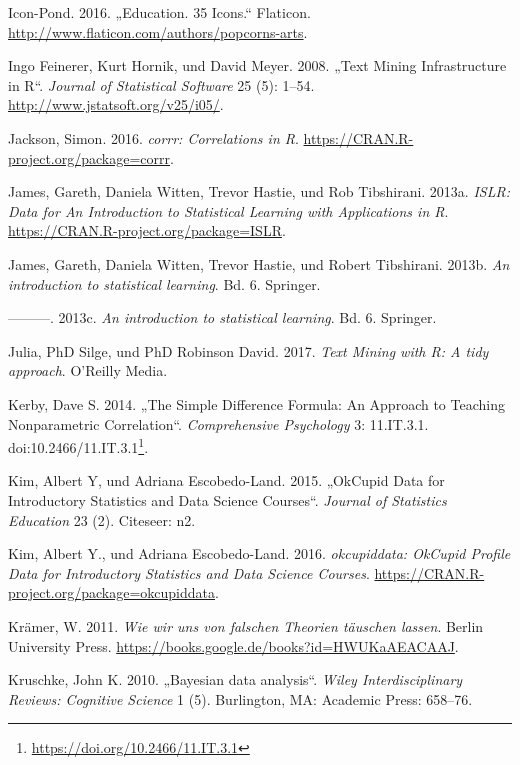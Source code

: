 \documentclass[12pt,ngerman,]{book}
\let\rmarkdownfootnote\footnote%
\def\footnote{\protect\rmarkdownfootnote}
\renewcommand{\href}[2]{#2\footnote{\url{#1}}}
\theoremstyle{definition}
\theoremstyle{definition}
\theoremstyle{remark}
\begin{document}
\hypertarget{ref-edu_icons}{}
Icon-Pond. 2016. „Education. 35 Icons.`` Flaticon.
\url{http://www.flaticon.com/authors/popcorns-arts}.

\hypertarget{ref-tm}{}
Ingo Feinerer, Kurt Hornik, und David Meyer. 2008. „Text Mining
Infrastructure in R``. \emph{Journal of Statistical Software} 25 (5):
1--54. \url{http://www.jstatsoft.org/v25/i05/}.

\hypertarget{ref-R-corrr}{}
Jackson, Simon. 2016. \emph{corrr: Correlations in R}.
\url{https://CRAN.R-project.org/package=corrr}.

\hypertarget{ref-R-ISLR}{}
James, Gareth, Daniela Witten, Trevor Hastie, und Rob Tibshirani. 2013a.
\emph{ISLR: Data for An Introduction to Statistical Learning with
Applications in R}. \url{https://CRAN.R-project.org/package=ISLR}.

\hypertarget{ref-introstatlearning}{}
James, Gareth, Daniela Witten, Trevor Hastie, und Robert Tibshirani.
2013b. \emph{An introduction to statistical learning}. Bd. 6. Springer.

\hypertarget{ref-james2013introduction}{}
---------. 2013c. \emph{An introduction to statistical learning}. Bd. 6.
Springer.

\hypertarget{ref-tidytextminig}{}
Julia, PhD Silge, und PhD Robinson David. 2017. \emph{Text Mining with
R: A tidy approach}. O'Reilly Media.

\hypertarget{ref-Kerby2014}{}
Kerby, Dave S. 2014. „The Simple Difference Formula: An Approach to
Teaching Nonparametric Correlation``. \emph{Comprehensive Psychology} 3:
11.IT.3.1.
doi:\href{https://doi.org/10.2466/11.IT.3.1}{10.2466/11.IT.3.1}.

\hypertarget{ref-kim2015okcupid}{}
Kim, Albert Y, und Adriana Escobedo-Land. 2015. „OkCupid Data for
Introductory Statistics and Data Science Courses``. \emph{Journal of
Statistics Education} 23 (2). Citeseer: n2.

\hypertarget{ref-R-okcupiddata}{}
Kim, Albert Y., und Adriana Escobedo-Land. 2016. \emph{okcupiddata:
OkCupid Profile Data for Introductory Statistics and Data Science
Courses}. \url{https://CRAN.R-project.org/package=okcupiddata}.

\hypertarget{ref-kraemer2011wir}{}
Krämer, W. 2011. \emph{Wie wir uns von falschen Theorien täuschen
lassen}. Berlin University Press.
\url{https://books.google.de/books?id=HWUKaAEACAAJ}.

\hypertarget{ref-kruschke2010bayesian}{}
Kruschke, John K. 2010. „Bayesian data analysis``. \emph{Wiley
Interdisciplinary Reviews: Cognitive Science} 1 (5). Burlington, MA:
Academic Press: 658--76.
\end{document}

